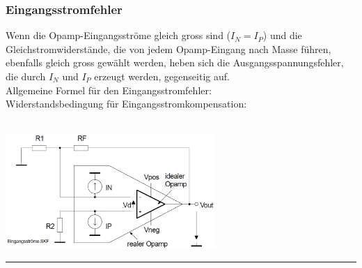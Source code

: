 		\subsubsection{Eingangsstromfehler }
			\begin{minipage}{18cm}
              Wenn die Opamp-Eingangsströme gleich gross sind
              ($I_{N}=I_{P}$) und die Gleichstromwiderstände,
              die von jedem Opamp-Eingang nach Masse führen, 
              ebenfalls gleich gross gewählt werden, heben sich die
              Ausgangsspannungsfehler, die durch $I_{N}$ und $I_{P}$
              erzeugt werden, gegenseitig auf. \\
              Allgemeine Formel für den
              Eingangsstromfehler:
                \hspace{20mm}
                \\ Widerstandsbedingung für Eingangsstromkompensation: \hspace{7.5mm}
            	\\
            \end{minipage}\\
			\includegraphics[width=8cm]{./bilder/eingangsstromfehler.png}


\hrule

